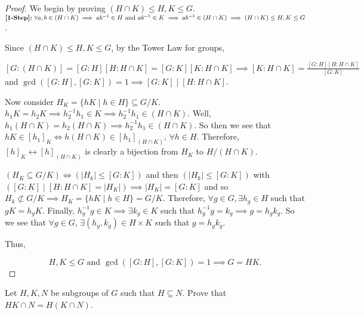 \documentclass[addpoints,10pt]{exam}
\theoremstyle{plain}
\theoremstyle{definition}
\newtheorem{prob}[thm]{Problem}
\theoremstyle{plain}
\theoremstyle{plain}
\theoremstyle{definition}
\let\oldprob\prob
\let\endoldprob\endprob
\renewenvironment{prob}
  {\begin{singlespace}\oldprob}
  {\endoldprob\end{singlespace}}
\newcommand{\belowtitle}{\leavevmode\newline}
\newcommand{\Observe}{\text{Observe.}}
\begin{document}
\begin{proof}
  We begin by proving $(H\cap K)\leq H,K\leq G$.\belowtitle
  $\textbf{[1-Step]:\;}\forall a,b\in (H\cap K)\implies ab^{-1}\in H\text{ and }ab^{-1}\in K\implies ab^{-1}\in (H\cap K)\implies (H\cap K)\leq H,K\leq G$.

  Since $(H\cap K)\leq H,K \leq G$, by the Tower Law for groups,
  \begin{center}
    $[G:(H\cap K)]=[G:H][H:H\cap K]=[G:K][K:H\cap K]\implies [K:H\cap K]=\frac{[G:H][H:H\cap K]}{[G:K]}$\newline
    and $\gcd([G:H],[G:K])=1\implies [G:K]\mid [H:H\cap K]$.
  \end{center}

  Now consider $H_{K}=\{hK\mid h\in H\}\subseteq G/K$. $h_{1}K=h_{2}K\implies h_{2}^{-1}h_{1}\in K\implies h_{2}^{-1}h_{1}\in (H\cap K).$ Well, $h_{1}(H\cap K)=h_{2}(H\cap K)\implies h_{2}^{-1}h_{1}\in (H\cap K)$. So then we see that $hK\in [h_{1}]_{K}\iff h(H\cap K)\in [h_{1}]_{(H\cap K)},\,\forall h\in H.$ Therefore, $[h]_{K}\leftrightarrow [h]_{(H\cap K)}$ is clearly a bijection from $H_{K}$ to $H/(H\cap K)$. \Observe

  $(H_{K}\subseteq G/K)\iff (|H_{k}|\leq [G:K])$ and then $(|H_{k}|\leq [G:K])$ with $([G:K]\mid [H:H\cap K]=|H_{K}|)\implies |H_{K}|=[G:K]$ and so $H_{k}\not\subset G/K\implies H_{K}=\{hK\mid h\in H\}=G/K.$ Therefore, $\forall g\in G,\exists h_{g}\in H$ such that $gK=h_{g}K$. Finally, $h_{g}^{-1}g\in K\implies \exists k_{g}\in K$ such that $h_{g}^{-1}g=k_{g}\implies g=h_{g}k_{g}$. So we see that $\forall g\in G,\,\exists (h_{g},k_{g})\in H\times K$ such that $g=h_{g}k_{g}$.

  Thus,

  $$H,K\leq G\text{ and }\gcd([G:H],[G:K])=1\implies G=HK.$$

\end{proof}
\newpage

\begin{prob}
  Let $H,K,N$ be subgroups of $G$ such that $H\subseteq N$. Prove that $HK\cap N = H(K\cap N)$.
\end{prob}
\end{document}
